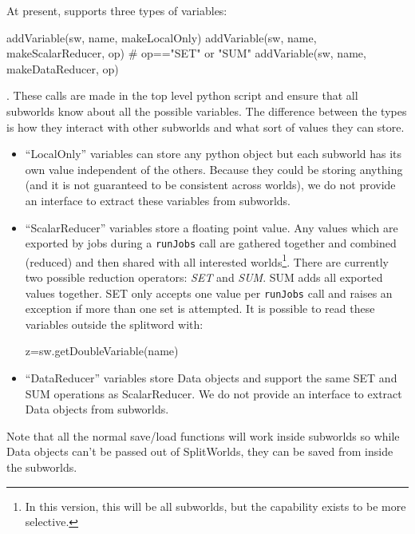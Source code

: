 \begin{description}
At present, \escript supports three types of variables:
\begin{python}
addVariable(sw, name, makeLocalOnly)
addVariable(sw, name, makeScalarReducer, op) # op=="SET" or "SUM"
addVariable(sw, name, makeDataReducer, op)
\end{python}
. 
These calls are made in the top level python script and ensure that all subworlds know about all the possible variables.
The difference between the types is how they interact with other subworlds and what sort of values they can store.
\begin{itemize}
 \item ``LocalOnly'' variables can store any python object but each subworld has its own value independent of the others.
 Because they could be storing anything (and it is not guaranteed to be consistent across worlds), we do not provide an 
 interface to extract these variables from subworlds.
 \item ``ScalarReducer'' variables store a floating point value.
Any values which are exported by jobs during a \texttt{runJobs} call are gathered together and combined (reduced) and then 
shared with all interested worlds\footnote{
In this version, this will be all subworlds, but the capability exists to be 
more selective.}.
  There are currently two possible reduction operators: \emph{SET} and \emph{SUM}.
  SUM adds all exported values together.
  SET only accepts one value per \texttt{runJobs} call and raises an exception if more than one set is attempted.
It is possible to read these variables outside the splitword with:
\begin{python}
 z=sw.getDoubleVariable(name)
\end{python}
\item ``DataReducer'' variables store Data objects and support the same SET and SUM operations as ScalarReducer.
We do not provide an interface to extract Data objects from subworlds.
\end{itemize}

Note that all the normal save/load functions will work inside subworlds so while Data objects can't be passed out of SplitWorlds, 
they can be saved from inside the subworlds.

\end{description}

